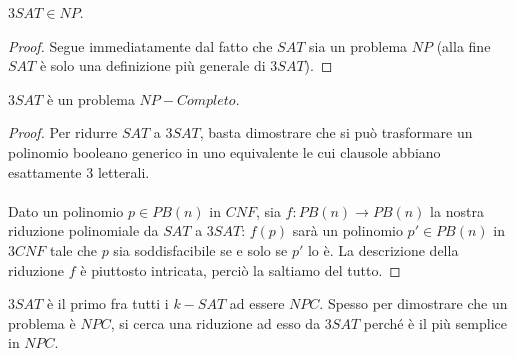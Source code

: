 \vspace{0.4cm}

\begin{lemm}
  $3SAT \in NP$.
\end{lemm}

\begin{proof}
	Segue immediatamente dal fatto che $SAT$ sia un problema $NP$ (alla fine $SAT$ è solo una definizione più generale di $3SAT$).
\end{proof}

\vspace{0.4cm}

\begin{lemm}
	$3SAT$ è un problema $NP-Completo$. 
\end{lemm}

\begin{proof}
	Per ridurre $SAT$ a $3SAT$, basta dimostrare che si può trasformare un polinomio booleano generico in uno equivalente le cui clausole abbiano esattamente 3 letterali. \\ \\
	Dato un polinomio $p \in PB(n)$ in $CNF$, sia $f : PB(n) \rightarrow PB(n)$ la nostra riduzione polinomiale da $SAT$ a $3SAT$: $f(p)$ sarà un polinomio $p' \in PB(n)$ in $3CNF$ tale che $p$ sia soddisfacibile se e solo se $p'$ lo è.  La descrizione della riduzione $f$ è piuttosto intricata, perciò la saltiamo del tutto.
\end{proof}

\vspace{0.4cm}

\begin{remark}
	$3SAT$ è il primo fra tutti i $k-SAT$ ad essere $NPC$. Spesso per dimostrare che un problema è $NPC$, si cerca una riduzione ad esso da $3SAT$ perché è il più semplice in $NPC$. 
\end{remark}

